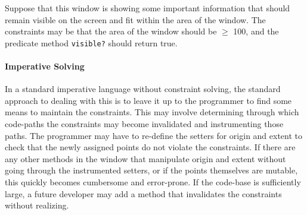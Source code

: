 Suppose that this window is showing some important information that
should remain visible on the screen and fit within the area of the
window. The constraints may be that the area of the window should be
$\geq$ 100, and the predicate method \verb!visible?! should return
true.

\paragraph{Imperative Solving}
In a standard imperative language without constraint solving, the
standard approach to dealing with this is to leave it up to the
programmer to find some means to maintain the constraints. This may
involve determining through which code-paths the constraints may
become invalidated and instrumenting those paths. The programmer may
have to re-define the setters for origin and extent to check that the
newly assigned points do not violate the constraints. If there are any
other methods in the window that manipulate origin and extent without
going through the instrumented setters, or if the points themselves
are mutable, this quickly becomes cumbersome and error-prone. If the
code-base is sufficiently large, a future developer may add a method
that invalidates the constraints without realizing.

